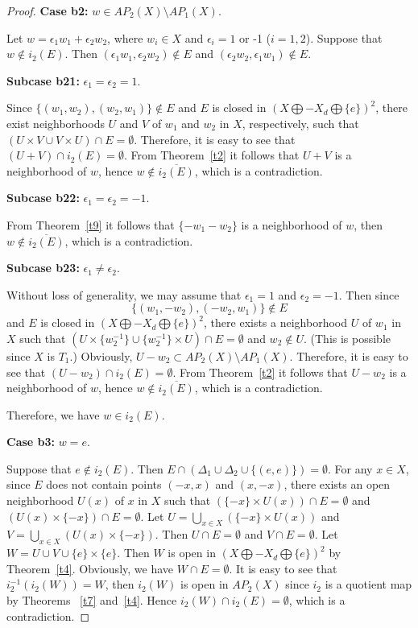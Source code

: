 \documentclass{amsart}
\theoremstyle{definition}
\begin{document}
\begin{proof}
{\bf Case b2:} $w\in AP_{2}(X)\setminus AP_{1}(X)$.

Let $w=\epsilon_{1}w_{1}+\epsilon_{2}w_{2}$, where $w_{i}\in X$ and $\epsilon_{i}=1$ or -1 ($i=1, 2$). Suppose that $w\not\in i_2(E)$. Then $(\epsilon_{1}w_{1}, \epsilon_{2}w_{2})\not\in E$ and $(\epsilon_{2}w_{2}, \epsilon_{1}w_{1})\not\in E$.

{\bf Subcase b21:} $\epsilon_{1}=\epsilon_{2}=1$.

Since $\{(w_{1}, w_{2}), (w_{2}, w_{1})\}\not\in E$ and $E$ is closed in $(X\bigoplus -X_{d}\bigoplus\{e\})^{2}$,  there exist neighborhoods $U$ and $V$ of $w_{1}$ and $w_{2}$ in $X$, respectively, such that
$(U\times V\cup V\times U)\cap E=\emptyset$. Therefore, it is easy to see that $(U+V)\cap i_2(E)=\emptyset$. From Theorem~\ref{t2} it follows that $U+V$ is a neighborhood of $w$, hence $w\not\in\overline{i_2(E)}$, which is a contradiction.

{\bf Subcase b22:} $\epsilon_{1}=\epsilon_{2}=-1$.

From Theorem~\ref{t9} it follows that $\{-w_{1}-w_{2}\}$ is a neighborhood of $w$, then $w\not\in\overline{i_2(E)}$, which is a contradiction.

{\bf Subcase b23:} $\epsilon_{1}\neq\epsilon_{2}$.

Without loss of generality, we may assume that $\epsilon_{1}=1$ and $\epsilon_{2}=-1$. Then since $$\{(w_{1}, -w_{2}), (-w_{2}, w_{1})\}\not\in E$$ and $E$ is closed in $(X\bigoplus -X_{d}\bigoplus\{e\})^{2}$,  there exists a neighborhood $U$ of $w_{1}$ in $X$ such that
$(U\times \{w_{2}^{-1}\}\cup \{w_{2}^{-1}\}\times U)\cap E=\emptyset$ and $w_{2}\not\in U$. (This is possible since $X$ is $T_{1}$.) Obviously, $U-w_{2}\subset AP_{2}(X)\setminus AP_{1}(X)$. Therefore, it is easy to see that $(U-w_{2})\cap i_2(E)=\emptyset$. From Theorem~\ref{t2} it follows that $U-w_{2}$ is a neighborhood of $w$, hence $w\not\in\overline{i_2(E)}$, which is a contradiction.

Therefore, we have $w\in i_2(E)$.

{\bf Case b3:} $w=e$.

Suppose that $e\not\in i_{2}(E)$. Then $E\cap (\Delta_{1}\cup \Delta_{2}\cup\{(e, e)\})=\emptyset$. For any $x\in X$, since $E$ does not contain points $(-x, x)$ and $(x, -x)$, there exists an open neighborhood $U(x)$ of $x$ in $X$ such that $(\{-x\}\times U(x))\cap E=\emptyset$ and $(U(x)\times \{-x\})\cap E=\emptyset$. Let $U=\bigcup_{x\in X}(\{-x\}\times U(x))$ and $V=\bigcup_{x\in X}(U(x)\times \{-x\})$. Then $U\cap E=\emptyset$ and $V\cap E=\emptyset$. Let $W=U\cup V\cup\{e\}\times\{e\}$. Then $W$ is open in $(X\bigoplus -X_{d}\bigoplus\{e\})^{2}$ by Theorem~\ref{t4}. Obviously, we have $W\cap E=\emptyset$. It is easy to see that $i_2^{-1}(i_2(W))=W$, then $i_2(W)$ is open in $AP_2(X)$ since $i_2$ is a quotient map by Theorems ~\ref{t7} and~\ref{t4}. Hence $i_2(W)\cap i_2(E)=\emptyset$, which is a contradiction.

\end{proof}
\end{document}
